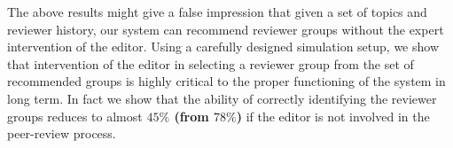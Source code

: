 The above results might give a false impression that given a set of topics and reviewer history, 
our system can recommend reviewer groups without the expert intervention of the editor. 
Using a carefully designed simulation setup, we show that intervention of the editor in selecting a reviewer group 
from the set of recommended groups is highly critical to the proper functioning of the system in long term. In fact 
we show that the ability of correctly identifying the reviewer groups reduces to almost  \textbf{ $45\%$ (from $78\%$)} if 
the editor is not involved in the peer-review process.


\medskip


